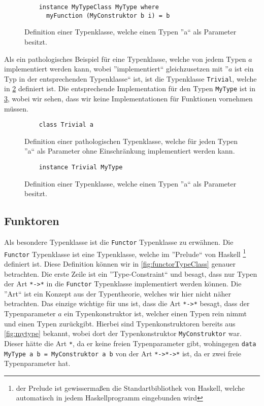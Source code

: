 \documentclass{hhuarticle}
\theoremstyle{definition}
\theoremstyle{theorem}
\begin{document}
  \begin{figure}[h]
    \begin{lstlisting}
    instance MyTypeClass MyType where
      myFunction (MyConstruktor b i) = b
    \end{lstlisting}
    \caption{Definition einer Typenklasse, welche einen Typen ''a`` als Parameter besitzt.}%
    \label{fig:mytypeinstance}
  \end{figure}

  Als ein pathologisches Beispiel für eine Typenklasse, welche von jedem
  Typen $a$ implementiert werden kann, wobei ''implementiert`` gleichzusetzen
  mit ''$a$ ist ein Typ in der entsprechenden Typenklasse`` ist, ist die
  Typenklasse \verb|Trivial|, welche in \cref{fig:trivialTypeClass} definiert ist.
  Die entsprechende Implementation für den Typen \verb|MyType| ist in \cref{fig:trivialTypeClassInstance},
  wobei wir sehen, dass wir keine Implementationen
  für Funktionen vornehmen müssen.

  \begin{figure}[h]
    \begin{lstlisting}
    class Trivial a
    \end{lstlisting}
    \caption{Definition einer pathologischen Typenklasse, welche für jeden Typen ''a`` als Parameter ohne Einschränkung implementiert werden kann.}%
    \label{fig:trivialTypeClass}
  \end{figure}

  \begin{figure}[h]
    \begin{lstlisting}
    instance Trivial MyType
    \end{lstlisting}
    \caption{Definition einer Typenklasse, welche einen Typen ''a`` als Parameter besitzt.}%
    \label{fig:trivialTypeClassInstance}
  \end{figure}

  \subsection{Funktoren}

  Als besondere Typenklasse ist die \verb|Functor| Typenklasse zu
  erwähnen. Die \verb|Functor| Typenklasse ist eine Typenklasse, welche
  im ''Prelude`` von Haskell
  \footnote{der Prelude ist gewissermaßen die Standartbibliothek von
  Haskell, welche automatisch in jedem Haskellprogramm eingebunden wird}
  definiert ist. Diese Definition können wir in
  \cref{fig:functorTypeClass} genauer betrachten.
  Die erste Zeile ist ein ''Type-Constraint`` und besagt, dass
  nur Typen der Art \verb|*->*| in die \verb|Functor| Typenklasse
  implementiert werden können. Die ''Art`` ist ein Konzept
  aus der Typentheorie, welches wir hier nicht näher betrachten.
  Das einzige wichtige für uns ist, dass die Art \verb|*->*|
  besagt, dass der Typenparameter $a$ ein Typenkonstruktor ist,
  welcher einen Typen rein nimmt und einen Typen zurückgibt.
  Hierbei sind Typenkonstruktoren bereits aus \cref{fig:mytype} bekannt,
  wobei dort der Typenkonstruktor \verb|MyConstruktor| war. Dieser
  hätte die Art \verb|*|, da er keine freien Typenparameter gibt,
  wohingegen \verb|data MyType a b = MyConstruktor a b| von der
  Art \verb|*->*->*| ist, da er zwei freie Typenparameter hat.
\end{document}
